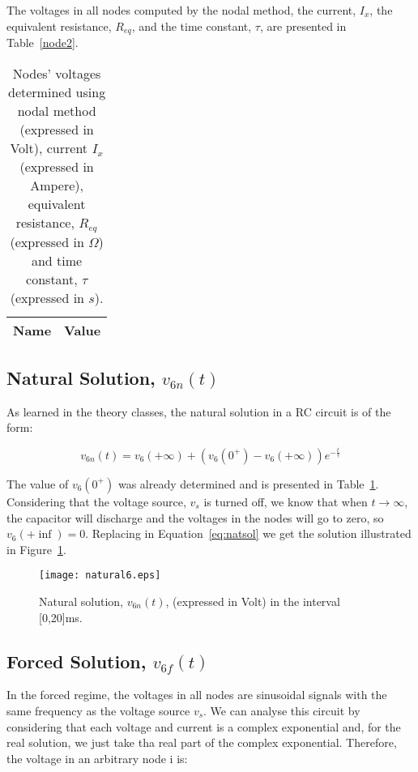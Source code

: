 The voltages in all nodes computed by the nodal method, the current, $I_x$, the equivalent resistance, $R_{eq}$, and the time constant, $\tau$, are presented in Table~\ref{node2}.

\begin{table}[H]
  \centering
  \begin{tabular}{|l|r|}
    \hline    
    {\bf Name} & {\bf Value} \\ \hline
    
  \end{tabular}
  \caption{Nodes' voltages determined using nodal method (expressed in Volt), current $I_x$ (expressed in Ampere), equivalent resistance, $R_{eq}$ (expressed in $\Omega$) and time constant, $\tau$ (expressed in $s$).}
  \label{tab:node2}
\end{table}


\subsection{Natural Solution, $v_{6n}(t)$}

As learned in the theory classes, the natural solution in a RC circuit is of the form:

\begin{equation}
  v_{6n}(t) = v_6(+\infty)+(v_6(0^+)-v_6(+\infty))e^{-\frac{t}{\tau}}
  \label{eq:natsol}
\end{equation}


The value of $v_6(0^+)$ was already determined and is presented in Table~\ref{tab:node2}. Considering that the voltage source, $v_s$ is turned off, we know that when $t \rightarrow \infty$, the capacitor will discharge and the voltages in the nodes will go to zero, so $v_6(+\inf)=0$. Replacing in Equation~\ref{eq:natsol} we get the solution illustrated in Figure~\ref{fig:natsol}.

\begin{figure}[H] \centering
\texttt{[image: natural6.eps]}
\caption{Natural solution, $v_{6n}(t)$, (expressed in Volt) in the interval [0,20]ms.}
\label{fig:natsol}
\end{figure}


\subsection{Forced Solution, $v_{6f}(t)$} \label{subsec:forsol}

In the forced regime, the voltages in all nodes are sinusoidal signals with the same frequency as the voltage source $v_s$. We can analyse this circuit by considering that each voltage and current is a complex exponential and, for the real solution, we just take tha real part of the complex exponential. Therefore, the voltage in an arbitrary node i is:

